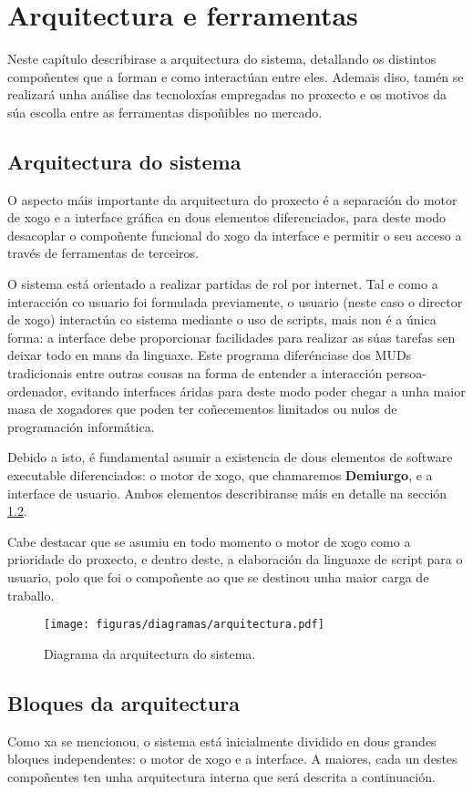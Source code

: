\chapter{Arquitectura e ferramentas}
Neste capítulo describirase a arquitectura do sistema, detallando os distintos
compoñentes que a forman e como interactúan entre eles. Ademais diso, tamén se
realizará unha análise das tecnoloxías empregadas no proxecto e os motivos da
súa escolla entre as ferramentas dispoñibles no mercado.

\section{Arquitectura do sistema}
O aspecto máis importante da arquitectura do proxecto é a separación do motor de
xogo e a interface gráfica en dous elementos diferenciados, para deste modo
desacoplar o compoñente funcional do xogo da interface e permitir o seu acceso
a través de ferramentas de terceiros.
\par
O sistema está orientado a realizar partidas de rol por internet. Tal e como
a interacción co usuario foi formulada previamente, o usuario (neste caso o
director de xogo) interactúa co sistema mediante o uso de scripts, mais non é a
única forma: a interface debe proporcionar facilidades para realizar as súas
tarefas sen deixar todo en mans da linguaxe. Este programa diferénciase dos MUDs
tradicionais entre outras cousas na forma de entender a interacción
persoa-ordenador, evitando interfaces áridas para deste modo poder chegar a unha
maior masa de xogadores que poden ter coñecementos limitados ou nulos de
programación informática.
\par
Debido a isto, é fundamental asumir a existencia de dous elementos de software
executable diferenciados: o motor de xogo, que chamaremos \textbf{Demiurgo}, e a
interface de usuario. Ambos elementos describiranse máis en detalle na sección
\ref{sec:bloques}.
\par
Cabe destacar que se asumiu en todo momento o motor de xogo como a prioridade do
proxecto, e dentro deste, a elaboración da linguaxe de script para o usuario,
polo que foi o compoñente ao que se destinou unha maior carga de traballo.
\begin{figure}
\centerline{\texttt{[image: figuras/diagramas/arquitectura.pdf]}}
\caption{Diagrama da arquitectura do sistema.}
\label{fig:arquitectura}
\end{figure}

\section{Bloques da arquitectura}
\label{sec:bloques}
Como xa se mencionou, o sistema está inicialmente dividido en dous grandes
bloques independentes: o motor de xogo e a interface. A maiores, cada un destes
compoñentes ten unha arquitectura interna que será descrita a continuación.


